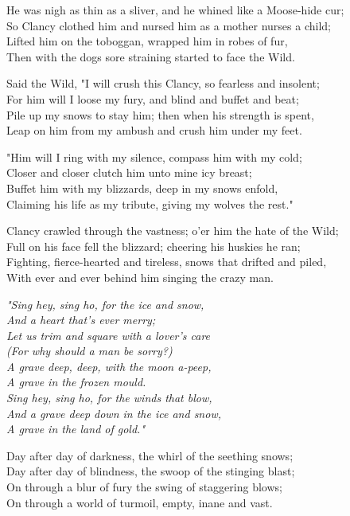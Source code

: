 \begin{poemblock}
 He was nigh as thin as a sliver, and he whined like a Moose-hide cur;\\
\idt So Clancy clothed him and nursed him as a mother nurses a child;\\
 Lifted him on the toboggan, wrapped him in robes of fur,\\
\idt Then with the dogs sore straining started to face the Wild.

 Said the Wild, "I will crush this Clancy, so fearless and insolent;\\
\idt For him will I loose my fury, and blind and buffet and beat;\\
 Pile up my snows to stay him; then when his strength is spent,\\
\idt Leap on him from my ambush and crush him under my feet.

 "Him will I ring with my silence, compass him with my cold;\\
\idt Closer and closer clutch him unto mine icy breast;\\
 Buffet him with my blizzards, deep in my snows enfold,\\
\idt Claiming his life as my tribute, giving my wolves the rest."

 Clancy crawled through the vastness; o'er him the hate of the Wild;\\
\idt Full on his face fell the blizzard; cheering his huskies he ran;\\
 Fighting, fierce-hearted and tireless, snows that drifted and piled,\\
\idt With ever and ever behind him singing the crazy man.

\indentedblock\itshape{
"Sing hey, sing ho, for the ice and snow,\\
\idt And a heart that's ever merry;\\
Let us trim and square with a lover's care\\
\idt (For why should a man be sorry?)\\
A grave deep, deep, with the moon a-peep,\\
\idt A grave in the frozen mould.\\
Sing hey, sing ho, for the winds that blow,\\
\idt And a grave deep down in the ice and snow,\\
A grave in the land of gold."
}

 Day after day of darkness, the whirl of the seething snows;\\
\idt Day after day of blindness, the swoop of the stinging blast;\\
 On through a blur of fury the swing of staggering blows;\\
\idt On through a world of turmoil, empty, inane and vast.


\end{poemblock}
